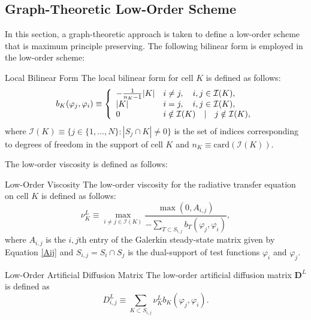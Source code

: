 \subsection{Graph-Theoretic Low-Order Scheme}\label{gtloworder}
In this section, a graph-theoretic approach is taken to define a low-order
scheme that is maximum principle preserving. The following bilinear form
is employed in the low-order scheme:
\begin{definition}{Local Bilinear Form}
   The local bilinear form for cell $K$ is defined as follows:
   \begin{equation}\label{bilinearform}
      b_K(\varphi_j, \varphi_i) \equiv \left\{\begin{array}{l l}
         -\frac{1}{n_K - 1}|K| & i\ne j, \quad i,j\in \mathcal{I}(K),\\
         |K|                   & i = j,  \quad i,j\in \mathcal{I}(K),\\
         0                     & i\notin\mathcal{I}(K) \quad | \quad j\notin\mathcal{I}(K),
      \end{array}\right.
   \end{equation}
   where $\mathcal{I}(K)\equiv \{j\in\{1,\ldots,N\}: |S_j\cap K|\ne 0\}$
   is the set of indices corresponding to degrees of freedom in
   the support of cell $K$ and $n_K \equiv \mbox{card}(\mathcal{I}(K))$.
\end{definition}
The low-order viscosity is defined as follows:
\begin{definition}{Low-Order Viscosity}
   The low-order viscosity for the radiative transfer equation on cell $K$ is
   defined as follows:
   \begin{equation}
      \nu_K^L \equiv \max\limits_{i\ne j\in \mathcal{I}(K)}\frac{\max(0,A_{i,j})}
         {-\sum\limits_{T\subset S_{i,j}} b_T(\varphi_j, \varphi_i)},
   \end{equation}
   where $A_{i,j}$ is the $i,j$th entry of the Galerkin steady-state
   matrix given by Equation \eqref{Aij} and $S_{i,j}=S_i\cap S_j$ is the
   dual-support of test functions $\varphi_i$ and $\varphi_j$.
\end{definition}
\begin{definition}{Low-Order Artificial Diffusion Matrix}
   The low-order artificial diffusion matrix $\mathbf{D}^L$ is defined as
   \begin{equation}\label{loworderdiffusionGT}
      D_{i,j}^L \equiv \sum\limits_{K\subset S_{i,j}}\nu_K^L b_K(\varphi_j,\varphi_i).
   \end{equation}
\end{definition}

